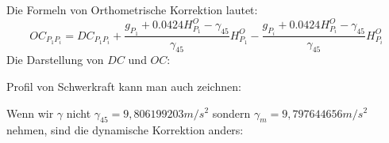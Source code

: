 \documentclass[12pt]{article}
\begin{document}
\newline
Die Formeln von Orthometrische Korrektion lautet:
\begin{equation*}
OC_{P_1 P_i} = DC_{P_1 P_i} + \frac{g_{P_1} + 0.0424 H^{O}_{P_1} - \gamma_{45}}{\gamma_{45}} H^{O}_{P_1} - \frac{g_{P_i} + 0.0424 H^{O}_{P_i} - \gamma_{45}}{\gamma_{45}} H^{O}_{P_i}
\end{equation*}
Die Darstellung von $DC$ und $OC$:
\begin{figure}[ht]\centering
\end{figure}
\newpage
Profil von Schwerkraft kann man auch zeichnen: 
\begin{figure}[ht]\centering
\end{figure}
\newline
Wenn wir $\gamma$ nicht $\gamma_{45} = 9,806199203 m/s^2$ sondern $\gamma_m = 9,797644656 m/s^2$ nehmen, sind die dynamische Korrektion anders:
\end{document}
